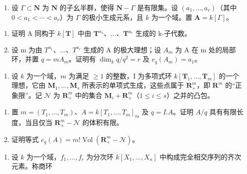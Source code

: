 
\begin{enumerate}
\def\labelenumi{\arabic{enumi})}
\tightlist
\item
  设 \(\Gamma \subset \mathbf{N}\) 为 \(\mathbf{N}\) 的子幺半群，使得 \(\mathbf{N} - \Gamma\) 是有限集。设 \((a_1, \ldots, a_r)\)（其中 \(0 < a_1 < \cdots < a_r\)）为 \(\Gamma\) 的极小生成元系，且 \(k\) 为一个域。置 \(\mathbf{A} = k[\Gamma]\)。
\end{enumerate}

\begin{enumerate}
\def\labelenumi{\alph{enumi})}
\item
  证明 A 同构于 \(k[\mathbf{T}]\) 中由 \(\mathbf{T}^{a_1}\)、\(\ldots\)、\(\mathbf{T}^{a_r}\) 生成的 k-子代数。
\item
  设 m 为由 \(T^{a_{1}}\)、\(\ldots\)、\(T^{a_{r}}\) 生成的 A 的极大理想；设 \(A_{m}\) 为 A 在 m 处的局部环，并置 \(q = mA_{m}\)。证明有 \(\dim_{k}q/q^{2} = r\) 及 \(e_{q}(A_{m}) = a_{1}\)。
\end{enumerate}

\begin{enumerate}
\def\labelenumi{\arabic{enumi})}
\setcounter{enumi}{1}
\tightlist
\item
  设 \(k\) 为一个域，\(m\) 为满足 \(\geqslant 1\) 的整数，I 为多项式环 \(k[\mathbf{T}_{1},\ldots,\mathbf{T}_{m}]\) 的一个理想，它由 \(\mathbf{M}_{1},\ldots,\mathbf{M}_{s}\) 所表示的单项式生成，这些点属于 \(\mathbf{R}_{+}^{m}\)，即 \(\mathbf{R}^{m}\) 的“正象限”。记 \(\mathcal{N}\) 为 \(\mathbf{R}_{+}^{m}\) 中的集合 \(\mathbf{M}_{i}+\mathbf{R}_{+}^{m}\)（\(1\leqslant i\leqslant s\)）之并的凸包。
\end{enumerate}

\begin{enumerate}
\def\labelenumi{\alph{enumi})}
\tightlist
\item
  置 \(m = (T_1, \ldots, T_m)\)、\(A = k[T_1, \ldots, T_m]_m\) 及 \(q = I.A\)。证明 \(A/q\) 具有有限长度，当且仅当 \(\mathbf{R}_+^m - \mathcal{N}\) 的体积有限。
\item
  证明等式 \(e_q(A) = m! \operatorname{Vol}(\mathbf{R}_+^m - \mathcal{N})\)。
\end{enumerate}

\begin{enumerate}
\def\labelenumi{\arabic{enumi})}
\setcounter{enumi}{2}
\tightlist
\item
  设 \(k\) 为一个域，\(f_{1},...,f_{r}\) 为分次环 \(k[X_{1},...,X_{n}]\) 中构成完全相交序列的齐次元素。称商环
\end{enumerate}

